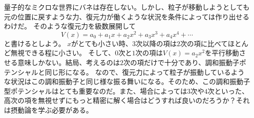 量子的なミクロな世界にバネは存在しない。しかし、粒子が移動しようとしても元の位置に戻すような力、復元力が働くような状況を条件によっては作り出せるわけだ。
そのような復元力を級数展開して
\begin{equation}
	V(x) = a_0 + a_1 x + a_2 x^2 + a_3 x^3 + a_4 x^4 + \cdots
\end{equation}
と書けるとしよう。
$x$がとても小さい時、$3$次以降の項は$2$次の項に比べてほとんど無視できる程に小さい。
そして、$0$次と$1$次の項は$V(x) = a_2 x^2$を平行移動させる意味しかない。結局、考えるのは$2$次の項だけで十分であり、調和振動子ポテンシャルと同じ形になる。
なので、復元力によって粒子が振動しているような状況はこの調和振動子と同じ様な振る舞いになる。そのため、この調和振動子型ポテンシャルはとても重要なのだ。また、場合によっては$3$次や$4$次といった、高次の項を無視せずにもっと精密に解く場合はどうすれば良いのだろうか？それは摂動論を学ぶ必要がある。

